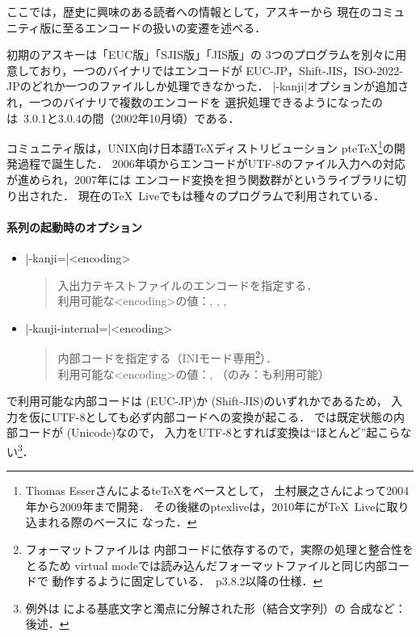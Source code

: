 \documentclass[a4paper,11pt,nomag,dvipdfmx]{jsarticle}
\begin{document}
\begin{dangerous}
ここでは，歴史に興味のある読者への情報として，アスキー\pTeX から
現在のコミュニティ版\pTeX に至るエンコードの扱いの変遷を述べる．

初期のアスキー\pTeX は「EUC版\pTeX 」「SJIS版\pTeX 」「JIS版\pTeX 」の
3つのプログラムを別々に用意しており，一つの\pTeX バイナリではエンコードが
EUC-JP，Shift-JIS，ISO-2022-JPのどれか一つのファイルしか処理できなかった．
|-kanji|オプションが追加され，一つの\pTeX バイナリで複数のエンコードを
選択処理できるようになったのは\pTeX~3.0.1と3.0.4の間（2002年10月頃）である．

コミュニティ版\pTeX は，UNIX向け日本語\TeX ディストリビューション
pte\TeX\footnote{Thomas Esserさんによるte\TeX をベースとして，
土村展之さんによって2004年から2009年まで開発．
その後継のptexliveは，2010年に\pTeX が\TeX~Liveに取り込まれる際のベースに
なった．}の開発過程で誕生した．
2006年頃からエンコードがUTF-8のファイル入力への対応が進められ，2007年には
エンコード変換を担う関数群がというライブラリに切り出された．
現在の\TeX~Liveでもは種々のプログラムで利用されている．
\end{dangerous}

\paragraph{\pTeX 系列の起動時のオプション}
\begin{itemize}
 \item |-kanji=|<encoding>
  \begin{quotation}
   入出力テキストファイルのエンコードを指定する．\\
   利用可能な<encoding>の値：, , , 
  \end{quotation}
 \item |-kanji-internal=|<encoding>
  \begin{quotation}
   内部コードを指定する（INIモード専用\footnote{フォーマットファイルは
   内部コードに依存するので，実際の処理と整合性をとるため
   virtual modeでは読み込んだフォーマットファイルと同じ内部コードで
   動作するように固定している．\pTeX\ p3.8.2以降の仕様．}）．\\
   利用可能な<encoding>の値：, 
   \quad （\upTeX のみ：も利用可能）
  \end{quotation}
\end{itemize}
\pTeX で利用可能な内部コードは (EUC-JP)か
 (Shift-JIS)のいずれかであるため，
入力を仮にUTF-8としても必ず内部コードへの変換が起こる．
\upTeX では既定状態の内部コードが (Unicode)なので，
入力をUTF-8とすれば変換は“ほとんど”起こらない\footnote{例外は
による基底文字と濁点に分解された形（結合文字列）の
合成など：後述．}．
\end{document}
